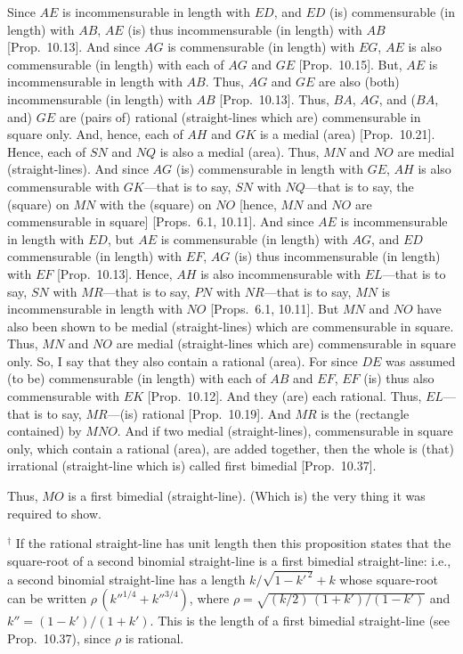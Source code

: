 \begin{Parallel}{}{}
{Since $AE$
is incommensurable in length with $ED$, and $ED$ (is) commensurable 
 (in length) with $AB$, $AE$ (is) thus incommensurable (in length) with $AB$ [Prop.~10.13]. And since $AG$
is commensurable (in length) with $EG$, $AE$ is also commensurable
(in length) with each of $AG$ and $GE$ [Prop.~10.15]. 
But, $AE$ is incommensurable in length with $AB$.  Thus, $AG$ and $GE$
are also (both) 
incommensurable (in length) with $AB$ [Prop.~10.13]. 
Thus, $BA$, $AG$,  and ($BA$, and) $GE$ are (pairs of) rational (straight-lines which are)
commensurable in square only. And, hence, each of $AH$ and $GK$ is a medial
(area) [Prop.~10.21]. Hence, each of $SN$ and $NQ$
is also a medial (area). Thus, $MN$ and $NO$ are medial (straight-lines). 
And since $AG$ (is) commensurable in length with $GE$, $AH$
is also commensurable with $GK$---that is to say, $SN$ with $NQ$---that is to say, the (square)
on $MN$  with the (square) on $NO$ [hence, $MN$ and $NO$
are commensurable in square] [Props.~6.1, 10.11]. And since $AE$ is incommensurable
in length with $ED$, but $AE$ is commensurable (in length) with $AG$,
and $ED$ commensurable (in length) with $EF$, $AG$ (is) thus
incommensurable (in length) with $EF$ [Prop.~10.13]. Hence, $AH$ is also incommensurable with $EL$---that is to say, $SN$ with $MR$---that is to
say, $PN$ with $NR$---that is to say, $MN$ is incommensurable
in length with $NO$  [Props.~6.1, 10.11]. But $MN$ and $NO$ have also
been shown to be medial (straight-lines) which are commensurable in square. 
Thus, $MN$ and $NO$ are medial (straight-lines which are) commensurable
in square only.
So,
I say that they also contain a rational (area). For since $DE$ was assumed
(to be) commensurable (in length) with each of $AB$ and $EF$, $EF$
(is) thus also commensurable with $EK$ [Prop.~10.12]. And they (are) each rational.
Thus, $EL$---that is to say, $MR$---(is) rational [Prop.~10.19]. And $MR$ is the (rectangle contained) by $MNO$. And if two medial (straight-lines), commensurable
in square only, which contain a rational (area), are added together, then the
whole is (that) irrational (straight-line which is)
called first bimedial [Prop.~10.37].

Thus, $MO$ is a first bimedial (straight-line). (Which is) the very thing it
was required to show.}
\end{Parallel}
{\footnotesize\noindent$^\dag$ If the rational straight-line has unit length then this proposition states that the square-root of 
a second binomial straight-line is a first bimedial straight-line: {i.e.}, 
a second binomial straight-line has a length $k/\sqrt{1-k'^{\,2}}+k$ whose
square-root can be written $\rho\,(k''^{1/4}+k''^{3/4})$, where $\rho=\sqrt{(k/2)\,(1+k')/(1-k')}$ and $k''=(1-k')/(1+k')$. This is the length of a first bimedial straight-line (see Prop.~10.37), since $\rho$ is rational.}

